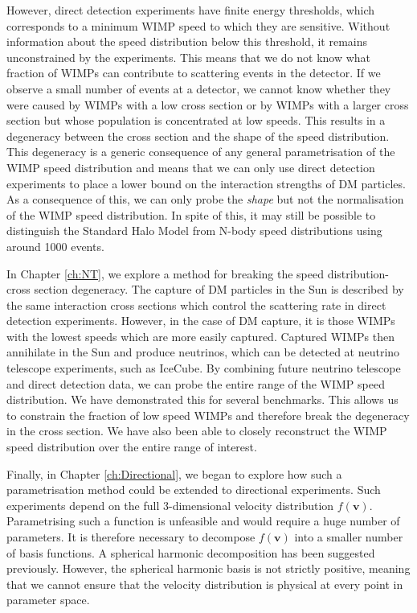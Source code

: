 However, direct detection experiments have finite energy thresholds, which corresponds to a minimum WIMP speed to which they are sensitive. Without information about the speed distribution below this threshold, it remains unconstrained by the experiments. This means that we do not know what fraction of WIMPs can contribute to scattering events in the detector. If we observe a small number of events at a detector, we cannot know whether they were caused by WIMPs with a low cross section or by WIMPs with a larger cross section but whose population is concentrated at low speeds. This results in a degeneracy between the cross section and the shape of the speed distribution. This degeneracy is a generic consequence of any general parametrisation of the WIMP speed distribution and means that we can only use direct detection experiments to place a lower bound on the interaction strengths of DM particles. As a consequence of this, we can only probe the \textit{shape} but not the normalisation of the WIMP speed distribution. In spite of this, it may still be possible to distinguish the Standard Halo Model from N-body speed distributions using around 1000 events.

In Chapter \ref{ch:NT}, we explore a method for breaking the speed distribution-cross section degeneracy. The capture of DM particles in the Sun is described by the same interaction cross sections which control the scattering rate in direct detection experiments. However, in the case of DM capture, it is those WIMPs with the lowest speeds which are more easily captured. Captured WIMPs then annihilate in the Sun and produce neutrinos, which can be detected at neutrino telescope experiments, such as IceCube. By combining future neutrino telescope and direct detection data, we can probe the entire range of the WIMP speed distribution. We have demonstrated this for several benchmarks. This allows us to constrain the fraction of low speed WIMPs and therefore break the degeneracy in the cross section. We have also been able to closely reconstruct the WIMP speed distribution over the entire range of interest. 


Finally, in Chapter \ref{ch:Directional}, we began to explore how such a parametrisation method could be extended to directional experiments. Such experiments depend on the full 3-dimensional velocity distribution $f(\textbf{v})$. Parametrising such a function is unfeasible and would require a huge number of parameters. It is therefore necessary to decompose $f(\textbf{v})$ into a smaller number of basis functions. A spherical harmonic decomposition has been suggested previously. However, the spherical harmonic basis is not strictly positive, meaning that we cannot ensure that the velocity distribution is physical at every point in parameter space. 

